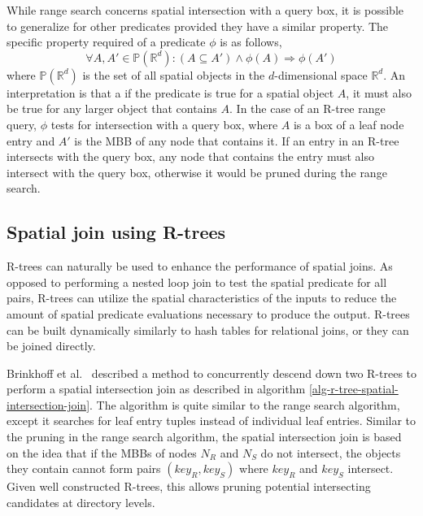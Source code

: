 While range search concerns spatial intersection with a query box, it is possible to generalize for other predicates provided they have a similar property. The specific property required of a predicate \(\phi\) is as follows,
\[
  \forall A, A' \in \mathbb{P}(\mathbb{R}^d) : (A \subseteq A') \wedge \phi(A) \Rightarrow \phi(A')
\]
where \(\mathbb{P}(\mathbb{R}^d)\) is the set of all spatial objects in the \(d\)-dimensional space \(\mathbb{R}^d\). An interpretation is that a if the predicate is true for a spatial object \(A\), it must also be true for any larger object that contains \(A\). In the case of an R-tree range query, \(\phi\) tests for intersection with a query box, where \(A\) is a box of a leaf node entry and \(A'\) is the MBB of any node that contains it. If an entry in an R-tree intersects with the query box, any node that contains the entry must also intersect with the query box, otherwise it would be pruned during the range search.

\subsection{Spatial join using R-trees}

R-trees can naturally be used to enhance the performance of spatial joins. As opposed to performing a nested loop join to test the spatial predicate for all pairs, R-trees can utilize the spatial characteristics of the inputs to reduce the amount of spatial predicate evaluations necessary to produce the output. R-trees can be built dynamically similarly to hash tables for relational joins, or they can be joined directly.

Brinkhoff et al.~\cite{brinkhoff1993efficient} described a method to concurrently descend down two R-trees to perform a spatial intersection join as described in algorithm \ref{alg-r-tree-spatial-intersection-join}. The algorithm is quite similar to the range search algorithm, except it searches for leaf entry tuples instead of individual leaf entries. Similar to the pruning in the range search algorithm, the spatial intersection join is based on the idea that if the MBBs of nodes \(N_R\) and \(N_S\) do not intersect, the objects they contain cannot form pairs \((key_R, key_S)\) where \(key_R\) and \(key_S\) intersect. Given well constructed R-trees, this allows pruning potential intersecting candidates at directory levels.

